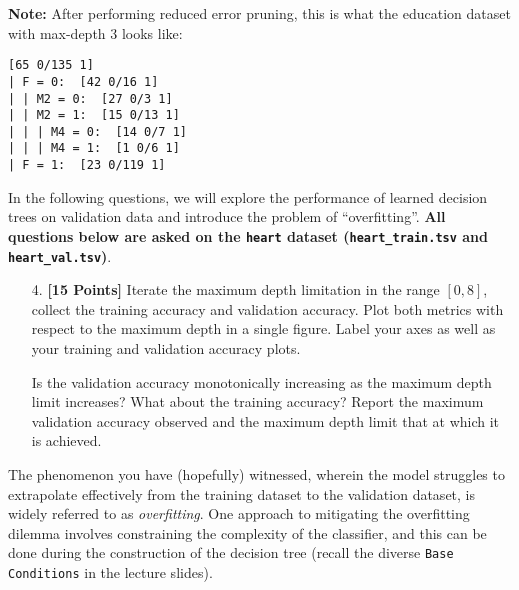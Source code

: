 \begin{enumerate}
\textbf{Note: }After performing reduced error pruning, this is what the education dataset with max-depth 3 looks like: 
\begin{lstlisting}[language=Shell]
[65 0/135 1]
| F = 0:  [42 0/16 1]
| | M2 = 0:  [27 0/3 1]
| | M2 = 1:  [15 0/13 1]
| | | M4 = 0:  [14 0/7 1]
| | | M4 = 1:  [1 0/6 1]
| F = 1:  [23 0/119 1]
\end{lstlisting}

    \begin{tcolorbox}[fit,height=10cm, width=15cm, blank, borderline={1pt}{-2pt},nobeforeafter]
    \end{tcolorbox}
    
    
\end{enumerate}
\newpage
In the following questions, we will explore the performance of learned decision trees on validation data and introduce the problem of ``overfitting''. \textbf{All questions below are asked on the \texttt{heart} dataset (\texttt{heart\_train.tsv} and \texttt{heart\_val.tsv})}.

\begin{enumerate}
    \item[4.] {\bf [15 Points]} Iterate the maximum depth limitation in the range $[0, 8]$, collect the training accuracy and validation accuracy. Plot both metrics with respect to the maximum depth in a single figure. Label your axes as well as your training and validation accuracy plots.

    Is the validation accuracy monotonically increasing as the maximum depth limit increases? What about the training accuracy? Report the maximum validation accuracy observed and the maximum depth limit that at which it is achieved.

    \begin{tcolorbox}[fit,height=7cm, width=15cm, blank, borderline={1pt}{-2pt},nobeforeafter]
        
        
    \end{tcolorbox}


    \end{enumerate}


    The phenomenon you have (hopefully) witnessed, wherein the model struggles to extrapolate effectively from the training dataset to the validation dataset, is widely referred to as \textit{overfitting}. One approach to mitigating the overfitting dilemma involves constraining the complexity of the classifier, and this can be done during the construction of the decision tree (recall the diverse \texttt{Base Conditions} in the lecture slides).

